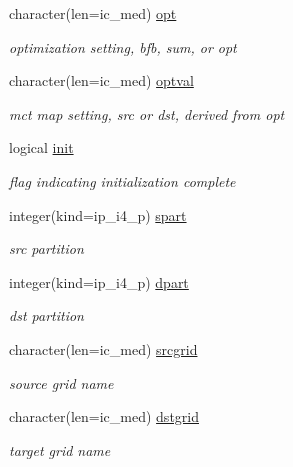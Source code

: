 \begin{DoxyCompactItemize}
character(len=ic\+\_\+med) \hyperlink{structmod__oasis__map_1_1prism__mapper__type_a3b10832f360b8f2061807dfdec6be493}{opt}
\begin{DoxyCompactList}\small\item\em optimization setting, bfb, sum, or opt \end{DoxyCompactList}\item 
character(len=ic\+\_\+med) \hyperlink{structmod__oasis__map_1_1prism__mapper__type_ad1516b48d26a0cf57a3c61c58298aa09}{optval}
\begin{DoxyCompactList}\small\item\em mct map setting, src or dst, derived from opt \end{DoxyCompactList}\item 
logical \hyperlink{structmod__oasis__map_1_1prism__mapper__type_aebd50312a6d63fb217231d7cb43cdf65}{init}
\begin{DoxyCompactList}\small\item\em flag indicating initialization complete \end{DoxyCompactList}\item 
integer(kind=ip\+\_\+i4\+\_\+p) \hyperlink{structmod__oasis__map_1_1prism__mapper__type_a26d7374d018e7d5b5b87d91eef9e02a9}{spart}
\begin{DoxyCompactList}\small\item\em src partition \end{DoxyCompactList}\item 
integer(kind=ip\+\_\+i4\+\_\+p) \hyperlink{structmod__oasis__map_1_1prism__mapper__type_a8a597bf1362ebd82c03fdd6ac887620e}{dpart}
\begin{DoxyCompactList}\small\item\em dst partition \end{DoxyCompactList}\item 
character(len=ic\+\_\+med) \hyperlink{structmod__oasis__map_1_1prism__mapper__type_a8d90dd5fc6b4f86705bf1dbe1391a8a3}{srcgrid}
\begin{DoxyCompactList}\small\item\em source grid name \end{DoxyCompactList}\item 
character(len=ic\+\_\+med) \hyperlink{structmod__oasis__map_1_1prism__mapper__type_a279bf3df7b5f87eec6e1b2ffdce3e5b1}{dstgrid}
\begin{DoxyCompactList}\small\item\em target grid name \end{DoxyCompactList}\end{DoxyCompactItemize}


